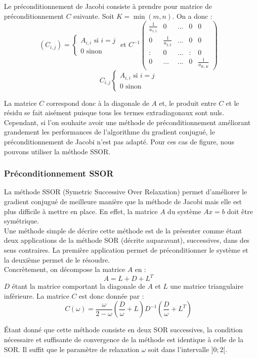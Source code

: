 Le préconditionnement de Jacobi consiste à prendre pour matrice de préconditionnement $C$ suivante. Soit $K=\min(m,n)$. On a donc :
$$
(C_{i,j})=
\begin{cases}
A_{i,i}\text{ si }i=j\\
0\text{ sinon }
\end{cases}
\text{ et }
C^{-1}
\begin{pmatrix}
\frac{1}{a_{1,1}}&0&...&0&0\\
0&\frac{1}{a_{2,2}}&...&0&0\\
:&0&...&:&0\\
0&...&...&0&\frac{1}{a_{K,K}}
\end{pmatrix}
$$
$$
C_{i,j}
\begin{cases}
A_{i,i}\text{ si } i=j\\
0 \text{ sinon}
\end{cases}
$$

La matrice $C$ correspond donc à la diagonale de $A$ et, le produit entre $C$ et le résidu se fait aisément puisque tous les termes extradiagonaux sont nuls. Cependant, si l'on souhaite avoir une méthode de préconditionnement améliorant grandement les performances de l'algorithme du gradient conjugué, le préconditionnement de Jacobi n'est pas adapté. Pour ces cas de figure, nous pouvons utiliser la méthode SSOR.
\subsubsection{Préconditionnement SSOR}
La méthode SSOR (Symetric Successive Over Relaxation) permet d'améliorer le gradient conjugué de meilleure manière que la méthode de Jacobi mais elle est plus difficile à mettre en place. En effet, la matrice $A$ du système $Ax=b$ doit être symétrique.\\

Une méthode simple de décrire cette méthode est de la présenter comme étant deux applications de la méthode SOR (décrite auparavant), successives, dans des sens contraires. La première application permet de préconditionner le système et la deuxième permet de le résoudre.\\

Concrètement, on décompose la matrice $A$ en :
$$
A=L+D+L^T
$$
$D$ étant la matrice comportant la diagonale de $A$ et $L$ une matrice triangulaire inférieure. La matrice $C$ est donc donnée par :
$$
C(\omega)=\frac{\omega}{2-\omega}(\frac{D}{\omega}+L)D^{-1}(\frac{D}{\omega}+L^T)
$$

Étant donné que cette méthode consiste en deux SOR successives, la condition nécessaire et suffisante de convergence de la méthode est identique à celle de la SOR. Il suffit que le paramètre de relaxation $\omega$ soit dans l'intervalle $]0;2[$.\\

